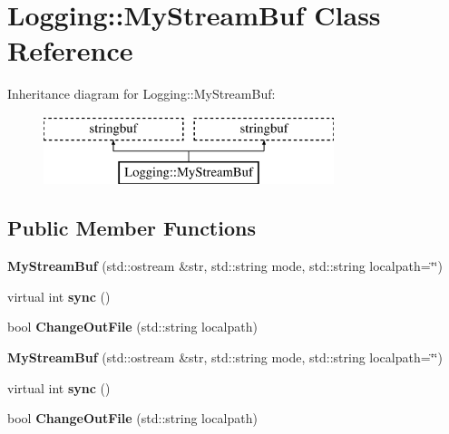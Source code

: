\hypertarget{classLogging_1_1MyStreamBuf}{\section{Logging\-:\-:My\-Stream\-Buf Class Reference}
\label{classLogging_1_1MyStreamBuf}
}
Inheritance diagram for Logging\-:\-:My\-Stream\-Buf\-:\begin{figure}[H]
\begin{center}
\leavevmode
\includegraphics[height=2.000000cm]{classLogging_1_1MyStreamBuf}
\end{center}
\end{figure}
\subsection*{Public Member Functions}
\begin{DoxyCompactItemize}
\item 
\hypertarget{classLogging_1_1MyStreamBuf_a05b8632ac8a69efc34144266fdef3441}{{\bfseries My\-Stream\-Buf} (std\-::ostream \&str, std\-::string mode, std\-::string localpath=\char`\"{}\char`\"{})}\label{classLogging_1_1MyStreamBuf_a05b8632ac8a69efc34144266fdef3441}

\item 
\hypertarget{classLogging_1_1MyStreamBuf_ae06a0c7f0f8c72ceb342630a819457cd}{virtual int {\bfseries sync} ()}\label{classLogging_1_1MyStreamBuf_ae06a0c7f0f8c72ceb342630a819457cd}

\item 
\hypertarget{classLogging_1_1MyStreamBuf_a400c762f73da994dd496b7234a0953fd}{bool {\bfseries Change\-Out\-File} (std\-::string localpath)}\label{classLogging_1_1MyStreamBuf_a400c762f73da994dd496b7234a0953fd}

\item 
\hypertarget{classLogging_1_1MyStreamBuf_a05b8632ac8a69efc34144266fdef3441}{{\bfseries My\-Stream\-Buf} (std\-::ostream \&str, std\-::string mode, std\-::string localpath=\char`\"{}\char`\"{})}\label{classLogging_1_1MyStreamBuf_a05b8632ac8a69efc34144266fdef3441}

\item 
\hypertarget{classLogging_1_1MyStreamBuf_ac8873bb6a99f361cc6fcd04f651e0e77}{virtual int {\bfseries sync} ()}\label{classLogging_1_1MyStreamBuf_ac8873bb6a99f361cc6fcd04f651e0e77}

\item 
\hypertarget{classLogging_1_1MyStreamBuf_a400c762f73da994dd496b7234a0953fd}{bool {\bfseries Change\-Out\-File} (std\-::string localpath)}\label{classLogging_1_1MyStreamBuf_a400c762f73da994dd496b7234a0953fd}

\end{DoxyCompactItemize}
